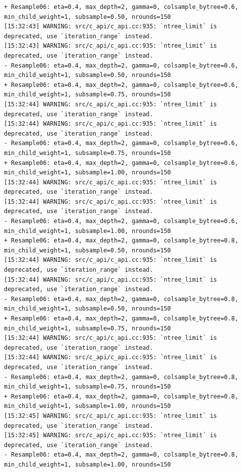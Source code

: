 \documentclass[
  letterpaper,
  DIV=11,
  numbers=noendperiod]{scrartcl}
\begin{document}
\begin{verbatim}
+ Resample06: eta=0.4, max_depth=2, gamma=0, colsample_bytree=0.6, min_child_weight=1, subsample=0.50, nrounds=150 
[15:32:43] WARNING: src/c_api/c_api.cc:935: `ntree_limit` is deprecated, use `iteration_range` instead.
[15:32:43] WARNING: src/c_api/c_api.cc:935: `ntree_limit` is deprecated, use `iteration_range` instead.
- Resample06: eta=0.4, max_depth=2, gamma=0, colsample_bytree=0.6, min_child_weight=1, subsample=0.50, nrounds=150 
+ Resample06: eta=0.4, max_depth=2, gamma=0, colsample_bytree=0.6, min_child_weight=1, subsample=0.75, nrounds=150 
[15:32:44] WARNING: src/c_api/c_api.cc:935: `ntree_limit` is deprecated, use `iteration_range` instead.
[15:32:44] WARNING: src/c_api/c_api.cc:935: `ntree_limit` is deprecated, use `iteration_range` instead.
- Resample06: eta=0.4, max_depth=2, gamma=0, colsample_bytree=0.6, min_child_weight=1, subsample=0.75, nrounds=150 
+ Resample06: eta=0.4, max_depth=2, gamma=0, colsample_bytree=0.6, min_child_weight=1, subsample=1.00, nrounds=150 
[15:32:44] WARNING: src/c_api/c_api.cc:935: `ntree_limit` is deprecated, use `iteration_range` instead.
[15:32:44] WARNING: src/c_api/c_api.cc:935: `ntree_limit` is deprecated, use `iteration_range` instead.
- Resample06: eta=0.4, max_depth=2, gamma=0, colsample_bytree=0.6, min_child_weight=1, subsample=1.00, nrounds=150 
+ Resample06: eta=0.4, max_depth=2, gamma=0, colsample_bytree=0.8, min_child_weight=1, subsample=0.50, nrounds=150 
[15:32:44] WARNING: src/c_api/c_api.cc:935: `ntree_limit` is deprecated, use `iteration_range` instead.
[15:32:44] WARNING: src/c_api/c_api.cc:935: `ntree_limit` is deprecated, use `iteration_range` instead.
- Resample06: eta=0.4, max_depth=2, gamma=0, colsample_bytree=0.8, min_child_weight=1, subsample=0.50, nrounds=150 
+ Resample06: eta=0.4, max_depth=2, gamma=0, colsample_bytree=0.8, min_child_weight=1, subsample=0.75, nrounds=150 
[15:32:44] WARNING: src/c_api/c_api.cc:935: `ntree_limit` is deprecated, use `iteration_range` instead.
[15:32:44] WARNING: src/c_api/c_api.cc:935: `ntree_limit` is deprecated, use `iteration_range` instead.
- Resample06: eta=0.4, max_depth=2, gamma=0, colsample_bytree=0.8, min_child_weight=1, subsample=0.75, nrounds=150 
+ Resample06: eta=0.4, max_depth=2, gamma=0, colsample_bytree=0.8, min_child_weight=1, subsample=1.00, nrounds=150 
[15:32:45] WARNING: src/c_api/c_api.cc:935: `ntree_limit` is deprecated, use `iteration_range` instead.
[15:32:45] WARNING: src/c_api/c_api.cc:935: `ntree_limit` is deprecated, use `iteration_range` instead.
- Resample06: eta=0.4, max_depth=2, gamma=0, colsample_bytree=0.8, min_child_weight=1, subsample=1.00, nrounds=150 

\end{verbatim}
\end{document}
